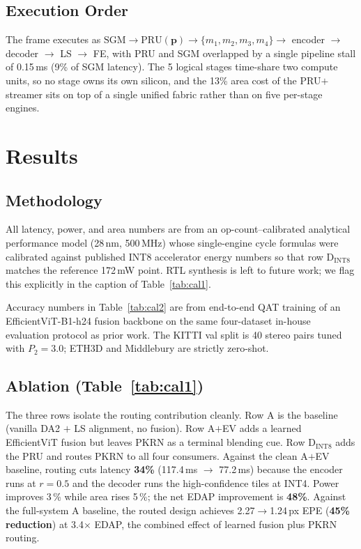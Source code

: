 \documentclass[journal,twocolumn]{IEEEtran}
\begin{document}
\subsection{Execution Order}
The frame executes as $\mathrm{SGM} \to \mathrm{PRU}(\mathbf{p}) \to \{m_1,m_2,m_3,m_4\} \to$ encoder $\to$ decoder $\to$ LS $\to$ FE, with PRU and SGM overlapped by a single pipeline stall of 0.15\,ms (9\% of SGM latency). The 5 logical stages time-share two compute units, so no stage owns its own silicon, and the 13\% area cost of the PRU$+$streamer sits on top of a single unified fabric rather than on five per-stage engines.

\section{Results}
\label{sec:results}



\subsection{Methodology}
All latency, power, and area numbers are from an op-count--calibrated analytical performance model (28\,nm, 500\,MHz) whose single-engine cycle formulas were calibrated against published INT8 accelerator energy numbers so that row D$_{\mathrm{INT8}}$ matches the reference 172\,mW point. RTL synthesis is left to future work; we flag this explicitly in the caption of Table~\ref{tab:cal1}.

Accuracy numbers in Table~\ref{tab:cal2} are from end-to-end QAT training of an EfficientViT-B1-h24 fusion backbone on the same four-dataset in-house evaluation protocol as prior work. The KITTI val split is 40 stereo pairs tuned with $P_2\!=\!3.0$; ETH3D and Middlebury are strictly zero-shot.

\subsection{Ablation (Table~\ref{tab:cal1})}
The three rows isolate the routing contribution cleanly. Row A is the baseline (vanilla DA2 $+$ LS alignment, no fusion). Row A$+$EV adds a learned EfficientViT fusion but leaves PKRN as a terminal blending cue. Row D$_{\mathrm{INT8}}$ adds the PRU and routes PKRN to all four consumers. Against the clean A$+$EV baseline, routing cuts latency \textbf{34\%} (117.4\,ms $\to$ 77.2\,ms) because the encoder runs at $r\!=\!0.5$ and the decoder runs the high-confidence tiles at INT4. Power improves 3\,\% while area rises 5\,\%; the net EDAP improvement is \textbf{48\%}. Against the full-system A baseline, the routed design achieves 2.27$\to$1.24\,px EPE (\textbf{45\% reduction}) at 3.4$\times$ EDAP, the combined effect of learned fusion plus PKRN routing.
\end{document}
